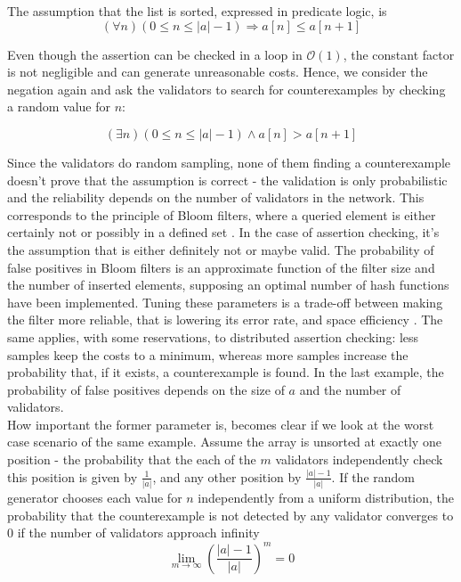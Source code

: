The assumption that the list is sorted, expressed in predicate logic, is
\begin{equation}\label{eq:sorted}
	(\forall n) (0 \leq n \le |a| - 1) \Rightarrow a[n] \leq a[n+1]
\end{equation}

Even though the assertion can be checked in a loop in $\mathcal{O}(1)$, the constant factor is not negligible and can generate unreasonable costs. Hence, we consider the negation again and ask the validators to search for counterexamples by checking a random value for $n$:
 
\begin{equation}\label{eq:sorted_neg}
	(\exists n) (0 \leq n \le |a| - 1) \wedge a[n] > a[n+1]
\end{equation}

Since the validators do random sampling, none of them finding a counterexample doesn't prove that the assumption is correct - the validation is only probabilistic and the reliability depends on the number of validators in the network. This corresponds to the principle of Bloom filters, where a queried element is either certainly not or possibly in a defined set \cite{blustein_bloom_2002}. In the case of assertion checking, it's the assumption that is either definitely not or maybe valid. The probability of false positives in Bloom filters is an approximate function of the filter size and the number of inserted elements, supposing an optimal number of hash functions have been implemented. Tuning these parameters is a trade-off between making the filter more reliable, that is lowering its error rate, and space efficiency \cite{blustein_bloom_2002}. The same applies, with some reservations, to distributed assertion checking: less samples keep the costs to a minimum, whereas more samples increase the probability that, if it exists, a counterexample is found. In the last example, the probability of false positives depends on the size of $a$ and the number of validators.\\
How important the former parameter is, becomes clear if we look at the worst case scenario of the same example. Assume the array is unsorted at exactly one position - the probability that the each of the $m$ validators independently check this position is given by $\frac{1}{|a|}$, and any other position by $\frac{|a|-1}{|a|}$. If the random generator chooses each value for $n$ independently from a uniform distribution, the probability that the counterexample is not detected by any validator converges to 0 if the number of validators approach infinity \cite{thiemann_2020}
\begin{equation}\label{eq:limes_validators}
	\lim_{m\to\infty} \left(\frac{|a|-1}{|a|}\right)^m = 0
\end{equation}

